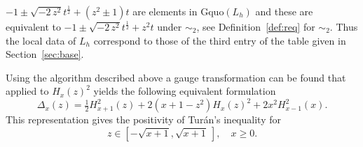 \documentclass{article}
\newcommand{\Gq}{\mathrm{Gquo}}
\begin{document}
$-1\pm\sqrt {-2\,{z}^{2}}t^\frac12+ \left( {z}^{2}\pm1 \right)t$ are elements in $\Gq(L_h)$ and
these are equivalent to $-1\pm\sqrt {-2\,{z}^{2}}t^\frac12+  {z}^{2}t$ under $\sim_2$, see Definition~\ref{def:req} for $\sim_2$. 
Thus the local data of $L_h$ correspond to those of the third entry of the table given in Section~\ref{sec:base}.


Using the algorithm described above a gauge transformation can be found that applied to 
$H_x(z)^2$ yields the following equivalent formulation
\[
\Delta_x(z) = \tfrac12 H_{x+1}^2(z)+2(x+1-z^2) H_x(z)^2 + 2x^2 H_{x-1}^2(x).
\]
This representation gives the positivity of Tur\'{a}n's inequality for
$$z\in[-\sqrt{x+1},\sqrt{x+1}\ ],\quad x\ge0.$$




\end{document}
